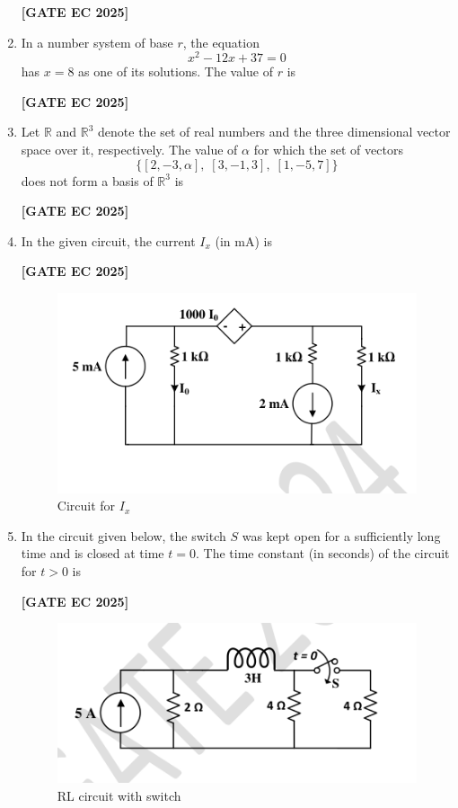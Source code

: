 \documentclass[12pt]{article}
\begin{document}
\begin{enumerate}[leftmargin=1.5em, label=\textbf{Q.\arabic*}., itemsep=2em]
\noindent \textbf{[GATE EC 2025]}

\item In a number system of base $r$, the equation
\[
x^2 - 12x + 37 = 0
\]
has $x=8$ as one of its solutions. The value of $r$ is

\noindent \textbf{[GATE EC 2025]}

\item Let $\mathbb{R}$ and $\mathbb{R}^3$ denote the set of real numbers and the three dimensional vector space over it, respectively. The value of $\alpha$ for which the set of vectors
\[
\{[2,-3,\alpha], \; [3,-1,3], \; [1,-5,7]\}
\]
does not form a basis of $\mathbb{R}^3$ is

\noindent \textbf{[GATE EC 2025]}

\item In the given circuit, the current $I_x$ (in mA) is

\noindent \textbf{[GATE EC 2025]}
\begin{figure}[H]\centering
\includegraphics[width=0.65\columnwidth]{figs/q31.png}
\caption{Circuit for $I_x$}
\label{fig:q31}
\end{figure}

\item In the circuit given below, the switch $S$ was kept open for a sufficiently long time and is closed at time $t = 0$. The time constant (in seconds) of the circuit for $t > 0$ is

\noindent \textbf{[GATE EC 2025]}
\begin{figure}[H]\centering
\includegraphics[width=0.65\columnwidth]{figs/q32.png}
\caption{RL circuit with switch}
\label{fig:q32}
\end{figure}


\end{enumerate}
\end{document}
